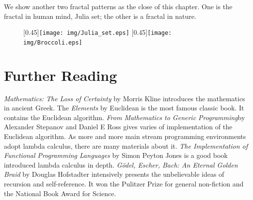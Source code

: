 \documentclass{article}
\begin{document}
We show another two fractal patterns as the close of this chapter. One is the fractal in human mind, Julia set; the other is a fractal in nature.

\begin{figure}[htbp]
 \centering
 [0.45\linewidth]{\texttt{[image: img/Julia\_set.eps]}}
 [0.45\linewidth]{\texttt{[image: img/Broccoli.eps]}}
 \label{fig:more-fractal}
\end{figure}

\section{Further Reading}

{\em Mathematics: The Loss of Certainty} by Morris Kline introduces the mathematics in ancient Greek. The {\em Elements} by Euclidean is the most famous classic book. It contains the Euclidean algorithm. {\em From Mathematics to Generic Programming}by Alexander Stepanov and Daniel E Ross gives varies of implementation of the Euclidean algorithm. As more and more main stream programming environments adopt lambda calculus, there are many materials about it. {\em The Implementation of Functional Programming Languages} by Simon Peyton Jones is a good book introduced lambda calculus in depth. {\em Gödel, Escher, Bach: An Eternal Golden Braid} by Douglas Hofstadter intensively presents the unbelievable ideas of recursion and self-reference. It won the Pulitzer Prize for general non-fiction and the National Book Award for Science.
\end{document}
